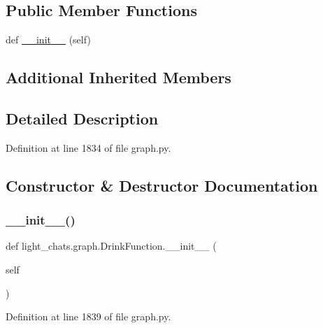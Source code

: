 \subsection*{Public Member Functions}
\begin{DoxyCompactItemize}
\item 
def \hyperlink{classlight__chats_1_1graph_1_1DrinkFunction_ab7c7036ff0885b5263458d0a75d5d878}{\+\_\+\+\_\+init\+\_\+\+\_\+} (self)
\end{DoxyCompactItemize}
\subsection*{Additional Inherited Members}


\subsection{Detailed Description}
\begin{DoxyVerb}
\end{DoxyVerb}
 

Definition at line 1834 of file graph.\+py.



\subsection{Constructor \& Destructor Documentation}
\mbox{\label{classlight__chats_1_1graph_1_1DrinkFunction_ab7c7036ff0885b5263458d0a75d5d878}} 
\subsubsection{\texorpdfstring{\+\_\+\+\_\+init\+\_\+\+\_\+()}{\_\_init\_\_()}}
{\footnotesize\ttfamily def light\+\_\+chats.\+graph.\+Drink\+Function.\+\_\+\+\_\+init\+\_\+\+\_\+ (\begin{DoxyParamCaption}\item[{}]{self }\end{DoxyParamCaption})}



Definition at line 1839 of file graph.\+py.


